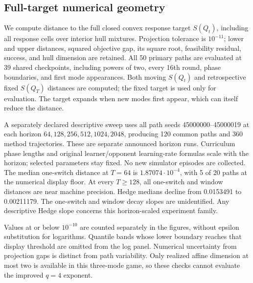 \subsection{Full-target numerical geometry}
We compute distance to the full closed convex response target $S(Q_t)$,
including all response cells over interior hull mixtures. Projection tolerance
is $10^{-11}$; lower and upper distances, squared objective gap, its square
root, feasibility residual, success, and hull dimension are retained.
All 50 primary paths are evaluated at 39 shared checkpoints, including
powers of two, every 16th round, phase boundaries, and first mode appearances.
Both moving $S(Q_t)$ and retrospective fixed $S(Q_T)$ distances are computed;
the fixed target is used only for evaluation. The target expands when new
modes first appear, which can itself reduce the distance.

A separately declared descriptive sweep uses all path seeds
45000000--45000019 at each horizon $64,128,256,512,1024,2048$, producing
120 common paths and 360 method trajectories. These are separate announced
horizon runs. Curriculum phase lengths and original learner/opponent
learning-rate formulas scale with the horizon; selected parameters stay fixed.
No new simulator episodes are collected. The median one-switch distance at
$T=64$ is $1.87074\cdot10^{-4}$, with 5 of 20 paths at the numerical display
floor. At every $T\ge128$, all one-switch and window distances are near
machine precision. Hedge medians decline from 0.0153491 to 0.00211179.
The one-switch and window decay slopes are unidentified. Any descriptive
Hedge slope concerns this horizon-scaled experiment family.

Values at or below $10^{-10}$ are counted separately in the figures, without
epsilon substitution for logarithms. Quantile bands whose lower boundary
reaches that display threshold are omitted from the log panel. Numerical
uncertainty from projection gaps is distinct from path variability.
Only realized affine dimension at most two is available in this three-mode
game, so these checks cannot evaluate the improved $q=4$ exponent.

